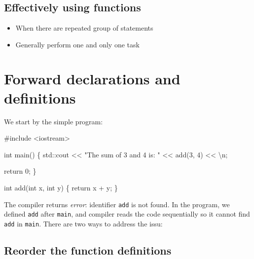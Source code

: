 \documentclass[
  letterpaper,
  DIV=11,
  numbers=noendperiod]{scrreprt}
\newenvironment{Shaded}{\begin{snugshade}}{\end{snugshade}}
\newcommand{\CommentTok}[1]{\textcolor[rgb]{0.37,0.37,0.37}{#1}}
\newcommand{\DecValTok}[1]{\textcolor[rgb]{0.68,0.00,0.00}{#1}}
\newcommand{\ErrorTok}[1]{\textcolor[rgb]{0.68,0.00,0.00}{#1}}
\newcommand{\FunctionTok}[1]{\textcolor[rgb]{0.28,0.35,0.67}{#1}}
\newcommand{\NormalTok}[1]{\textcolor[rgb]{0.00,0.23,0.31}{#1}}
\newcommand{\SpecialCharTok}[1]{\textcolor[rgb]{0.37,0.37,0.37}{#1}}
\newcommand{\StringTok}[1]{\textcolor[rgb]{0.13,0.47,0.30}{#1}}
\providecommand{\tightlist}{%
  \setlength{\itemsep}{0pt}\setlength{\parskip}{0pt}}\usepackage{longtable,booktabs,array}
\begin{document}
\hypertarget{effectively-using-functions}{%
\subsection{Effectively using
functions}\label{effectively-using-functions}}

\begin{itemize}
\tightlist
\item
  When there are repeated group of statements
\item
  Generally perform one and only one task
\end{itemize}

\hypertarget{forward-declarations-and-definitions}{%
\section{Forward declarations and
definitions}\label{forward-declarations-and-definitions}}

We start by the simple program:

\begin{Shaded}
\begin{Highlighting}[]
\CommentTok{\#include \textless{}iostream\textgreater{}}

\NormalTok{int }\FunctionTok{main}\NormalTok{()}
\NormalTok{\{}
\NormalTok{    std}\SpecialCharTok{::}\NormalTok{cout }\SpecialCharTok{\textless{}}\ErrorTok{\textless{}} \StringTok{"The sum of 3 and 4 is: "} \SpecialCharTok{\textless{}}\ErrorTok{\textless{}} \FunctionTok{add}\NormalTok{(}\DecValTok{3}\NormalTok{, }\DecValTok{4}\NormalTok{) }\SpecialCharTok{\textless{}}\ErrorTok{\textless{}} \StringTok{\textquotesingle{}}\SpecialCharTok{\textbackslash{}n}\StringTok{\textquotesingle{}}\NormalTok{;}

\NormalTok{    return }\DecValTok{0}\NormalTok{;}
\NormalTok{\}}

\NormalTok{int }\FunctionTok{add}\NormalTok{(int x, int y)}
\NormalTok{\{}
\NormalTok{    return x }\SpecialCharTok{+}\NormalTok{ y;}
\NormalTok{\}}
\end{Highlighting}
\end{Shaded}

The compiler returns \emph{error}: identifier \texttt{add} is not found.
In the program, we defined \texttt{add} after \texttt{main}, and
compiler reads the code sequentially so it cannot find \texttt{add} in
\texttt{main}. There are two ways to address the issu:

\hypertarget{reorder-the-function-definitions}{%
\subsection{Reorder the function
definitions}\label{reorder-the-function-definitions}}
\end{document}
